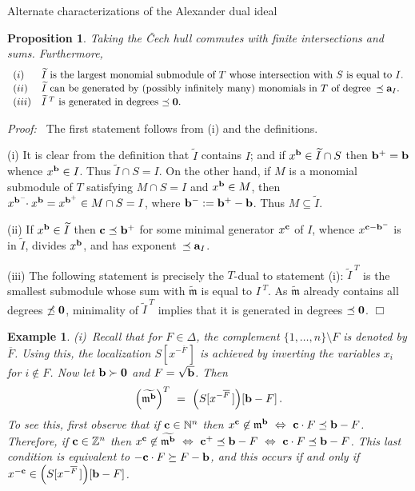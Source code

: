 \documentclass[12pt,leqno]{article}
\newtheorem{prop}[thm]{Proposition}
\newtheorem{example}[thm]{Example}
\def\aa{{{\rm \bf a}}}
\def\bb{{{\rm \bf b}}}
\def\cc{{{\rm \bf c}}}
\def\mm{{\mathfrak m}}
\def\NN{{\mathbb N}}
\def\ZZ{{\mathbb Z}}
\begin{document}
\begin{section}{Alternate characterizations of the Alexander dual ideal}
\begin{prop} \label{prop:tilde}
Taking the \v Cech hull commutes with finite intersections and sums.
Furthermore,
$$
\begin{array}{ll}
(i)&
	\hbox{$\widetilde I$ is the largest monomial submodule of $T$ whose
	intersection with $S$ is equal to $I$.} \cr
(ii)&
	\hbox{$\widetilde I$ can be generated by (possibly infinitely
	many) monomials in $T$ of degree $\, \preceq \aa_I$.} \cr
(iii)&
	\hbox{$\widetilde{I}^{\;T}$ is generated in degrees $\preceq {\bf
	0}$.} \cr
\end{array}
$$
\end{prop}
{\it Proof:\ } The first statement follows from (i) and the definitions.

\vskip 1mm \noindent 
(i) It is clear from the definition that $\widetilde{I}$ contains $I$;
and if $x^\bb \in \widetilde{I} \cap S$ then $\bb^+ = \bb$ whence $x^\bb
\in I$.  Thus $\widetilde{I} \cap S = I$.  On the other hand, if $M$ is a
monomial submodule of $T$ satisfying $M \cap S = I$ and $x^\bb \in M$,
then $x^{\bb^-} \!\!\cdot x^\bb = x^{\bb^+} \in M \cap S = I$, where
$\bb^- := \bb^+ - \bb$.  Thus $M \subseteq \widetilde{I}$.

\vskip 1mm \noindent
(ii) If $x^\bb \in \widetilde{I}$ then $\cc \preceq \bb^+$ for some
minimal generator $x^\cc$ of $I$, whence $x^{\cc - \bb^-}$ is in
$\widetilde{I}$, divides $x^\bb$, and has exponent $\,\preceq \aa_I$.

\vskip 1mm \noindent
(iii) The following statement is precisely the $T$-dual to statement (i):
$\widetilde{I}^{\;T}$ is the smallest submodule whose sum with
$\widetilde{\mm}$ is equal to $I^{\;T}\!$.  As $\widetilde{\mm}$ already
contains all degrees $\not\preceq {\bf 0}$, minimality of
$\widetilde{I}^{\;T}$ implies that it is generated in degrees $\preceq
{\bf 0}$.
%
\hfill
$\Box$

\begin{example}\rm \label{ex:tilde}
(i)\ Recall that for $F \in \Delta$, the complement $\{1,\ldots,n\}
\setminus F$ is denoted by $\overline F$.  Using this, the localization
$S[x^{-{\overline F}\,}]$ is achieved by inverting the variables $x_i$
for $i \not\in F$.  Now let $\bb \succ {\bf 0}$ and $F = \sqrt\bb$.  Then
$$
  \Bigl(\widetilde{\mm^\bb}\Bigr)^T\ 
	=\ \Bigl(S[x^{-{\overline F}\,}]\Bigr)[\bb-F]\,.
$$
To see this, first observe that if $\cc \in \NN^n$ then $x^\cc \not\in
\mm^\bb\ \Leftrightarrow\ \cc \cdot F \preceq \bb-F$.  Therefore, if $\cc
\in \ZZ^n$ then $x^\cc \not\in \widetilde{\mm^\bb}\ \Leftrightarrow\
\cc^+ \preceq \bb-F\ \Leftrightarrow\ \cc \cdot F \preceq \bb-F$.  This
last condition is equivalent to $-\cc \cdot F \succeq F-\bb$, and this
occurs if and only if $x^{-\cc} \in \Bigl(S[x^{-{\overline F}\,}]\Bigr)
[\bb-F]$.


\end{example}
\end{section}
\end{document}
